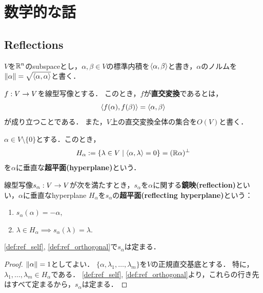 \newpage
\section{数学的な話}
\subsection{Reflections}
$V$を$\mathbb{R}^n$のsubspaceとし，$\alpha, \beta \in V$の標準内積を$\left\langle \alpha, \beta \right\rangle$と書き，$\alpha$のノルムを$\left\| \alpha \right\| = \sqrt{\left\langle \alpha, \alpha \right\rangle}$と書く．

\begin{definition}
  $f : V \rightarrow V$を線型写像とする．
  このとき，$f$が\textbf{直交変換}であるとは，
  \begin{equation}
    \left\langle f(\alpha), f(\beta) \right\rangle = \left\langle \alpha, \beta \right\rangle
  \end{equation}
  が成り立つことである．
  また，$V$上の直交変換全体の集合を$O(V)$と書く．
\end{definition}

\begin{definition}
  $\alpha \in V \setminus \{0\}$とする．このとき，
  \begin{equation}
    H_\alpha := \left\lbrace \lambda \in V \mathrel{} \middle| \mathrel{} \left\langle \alpha, \lambda \right\rangle = 0 \right\rbrace = (\mathbb{R} \alpha)^{\perp}
  \end{equation}
  を$\alpha$に垂直な\textbf{超平面(hyperplane)}という．
\end{definition}

\begin{definition}
  線型写像$s_\alpha : V \rightarrow V$が次を満たすとき，$s_\alpha$を$\alpha$に関する\textbf{鏡映(reflection)}といい，$\alpha$に垂直なhyperplane $H_\alpha$を$s_\alpha$の\textbf{超平面(reflecting hyperplane)}という：
  \begin{enumerate}[label=(\roman*)]
    \item $s_\alpha (\alpha) = -\alpha$, \label{def:ref_self}
    \item $\lambda \in H_\alpha \implies s_\alpha(\lambda) = \lambda$. \label{def:ref_orthogonal}
  \end{enumerate}
\end{definition}

\begin{remark}
  \ref{def:ref_self}, \ref{def:ref_orthogonal}で$s_\alpha$は定まる．
\end{remark}

\begin{proof}
  $\left\| \alpha \right\| = 1$としてよい．
  $\{\alpha, \lambda_1, \ldots, \lambda_m\}$を$V$の正規直交基底とする．
  特に，$\lambda_1, \ldots, \lambda_m \in H_\alpha$である．
  \ref{def:ref_self}, \ref{def:ref_orthogonal}より，これらの行き先はすべて定まるから，$s_\alpha$は定まる．
\end{proof}


